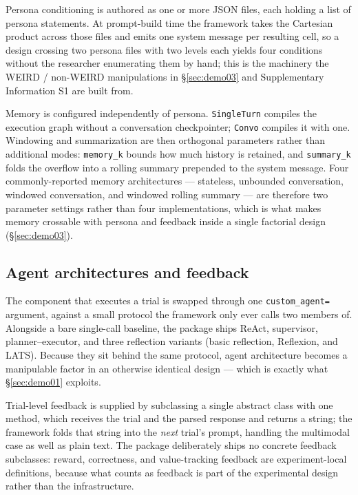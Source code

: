 \documentclass[11pt]{article}
\begin{document}
Persona conditioning is authored as one or more JSON files, each holding a
list of persona statements. At prompt-build time the framework takes the
Cartesian product across those files and emits one system message per
resulting cell, so a design crossing two persona files with two levels each
yields four conditions without the researcher enumerating them by hand;
this is the machinery the WEIRD / non-WEIRD manipulations in
\S\ref{sec:demo03} and Supplementary Information S1 are built from.

Memory is configured independently of persona. \texttt{SingleTurn} compiles
the execution graph without a conversation checkpointer; \texttt{Convo}
compiles it with one. Windowing and summarization are then orthogonal
parameters rather than additional modes: \texttt{memory\_k} bounds how much
history is retained, and \texttt{summary\_k} folds the overflow into a
rolling summary prepended to the system message. Four commonly-reported
memory architectures --- stateless, unbounded conversation, windowed
conversation, and windowed rolling summary --- are therefore two parameter
settings rather than four implementations, which is what makes memory
crossable with persona and feedback inside a single factorial design
(\S\ref{sec:demo03}).

\subsection{Agent architectures and feedback}
\label{sec:agentsfeedback}

The component that executes a trial is swapped through one
\texttt{custom\_agent=} argument, against a small protocol the framework
only ever calls two members of. Alongside a bare single-call baseline, the
package ships ReAct, supervisor, planner--executor, and three reflection
variants (basic reflection, Reflexion, and LATS). Because they sit behind
the same protocol, agent architecture becomes a manipulable factor in an
otherwise identical design --- which is exactly what \S\ref{sec:demo01}
exploits.

Trial-level feedback is supplied by subclassing a single abstract class
with one method, which receives the trial and the parsed response and
returns a string; the framework folds that string into the \emph{next}
trial's prompt, handling the multimodal case as well as plain text. The
package deliberately ships no concrete feedback subclasses: reward,
correctness, and value-tracking feedback are experiment-local definitions,
because what counts as feedback is part of the experimental design rather
than the infrastructure.
\end{document}
